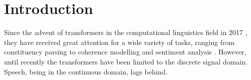 \documentclass[sigconf]{acmart}
\begin{document}




\maketitle
\pagestyle{plain} 
\section{Introduction}
Since the advent of transformers in the computational linguistics field in 2017 \cite{vaswani2017attention}, they have received great attention for a wide variety of tasks, ranging from constituency parsing \cite{kitaev2018constituency} to coherence modelling \cite{patil2020towards} and sentiment analysis \cite{tang2020dependency}. 
However, until recently the transformers have been limited to the discrete signal domain. Speech, being in the continuous domain, lags behind. 
\end{document}
